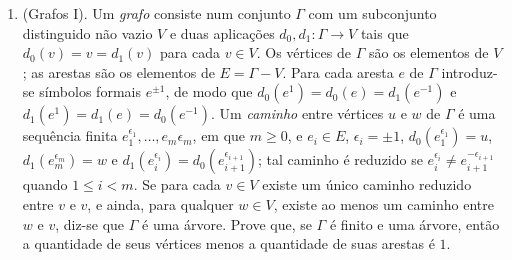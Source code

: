 \begin{enumerate}[label=2.\arabic*.]
    \item (Grafos I).
    Um \emph{grafo} consiste num conjunto $\Gamma$ com um subconjunto distinguido
    não vazio $V$ e duas aplicações $d_0, d_1 : \Gamma \to V$ tais que
    $d_0(v) = v = d_1(v)$ para cada $v \in V$. Os vértices de $\Gamma$ são os elementos 
    de $V$; as arestas são os elementos de $E = \Gamma - V$.
    Para cada aresta $e$ de $\Gamma$ introduz-se símbolos formais $e^{\pm 1}$, de modo que
    $d_0(e^1) = d_0(e) = d_1(e^{-1})$ e $d_1(e^1) = d_1(e) = d_0(e^{-1})$. 
    Um \emph{caminho} entre vértices $u$ e $w$ de $\Gamma$ é uma sequência finita
    $e_1^{\epsilon_1}, \ldots, e_m{\epsilon_m}$, em que $m \ge 0$, e $e_i \in E$,
    $\epsilon_i = \pm 1$, $d_0(e_1^{\epsilon_1}) = u$, $d_1(e_m^{\epsilon_m}) = w$
    e $d_1(e_i^{\epsilon_i}) = d_0(e_{i+1}^{\epsilon_{i + 1}})$;
    tal caminho é reduzido se $e_i^{\epsilon_i} \neq e_{i+1}^{-\epsilon_{i+1}}$ 
    quando $1 \le i < m$. Se para cada $v \in V$ existe um único caminho reduzido entre $v$ e
    $v$, e ainda, para qualquer $w \in V$, existe ao menos um caminho entre
    $w$ e $v$, diz-se que $\Gamma$ é uma árvore.
    Prove que, se $\Gamma$ é finito e uma árvore, então a quantidade de seus
    vértices menos a quantidade de suas arestas é $1$.
\end{enumerate}
